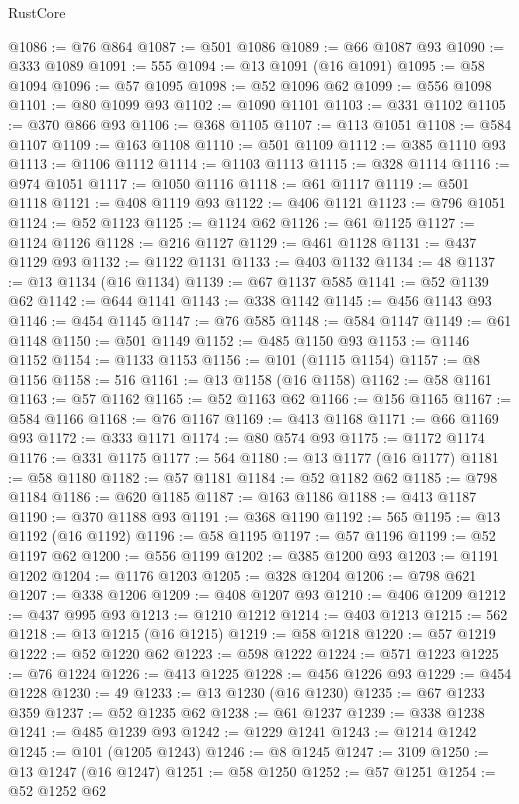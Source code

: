 \begin{lexlean}{RustCore}
\begin{coremodule}
@1086 := @76 @864
@1087 := @501 @1086
@1089 := @66 @1087 @93
@1090 := @333 @1089
@1091 := 555
@1094 := @13 @1091 (@16 @1091)
@1095 := @58 @1094
@1096 := @57 @1095
@1098 := @52 @1096 @62
@1099 := @556 @1098
@1101 := @80 @1099 @93
@1102 := @1090 @1101
@1103 := @331 @1102
@1105 := @370 @866 @93
@1106 := @368 @1105
@1107 := @113 @1051
@1108 := @584 @1107
@1109 := @163 @1108
@1110 := @501 @1109
@1112 := @385 @1110 @93
@1113 := @1106 @1112
@1114 := @1103 @1113
@1115 := @328 @1114
@1116 := @974 @1051
@1117 := @1050 @1116
@1118 := @61 @1117
@1119 := @501 @1118
@1121 := @408 @1119 @93
@1122 := @406 @1121
@1123 := @796 @1051
@1124 := @52 @1123
@1125 := @1124 @62
@1126 := @61 @1125
@1127 := @1124 @1126
@1128 := @216 @1127
@1129 := @461 @1128
@1131 := @437 @1129 @93
@1132 := @1122 @1131
@1133 := @403 @1132
@1134 := 48
@1137 := @13 @1134 (@16 @1134)
@1139 := @67 @1137 @585
@1141 := @52 @1139 @62
@1142 := @644 @1141
@1143 := @338 @1142
@1145 := @456 @1143 @93
@1146 := @454 @1145
@1147 := @76 @585
@1148 := @584 @1147
@1149 := @61 @1148
@1150 := @501 @1149
@1152 := @485 @1150 @93
@1153 := @1146 @1152
@1154 := @1133 @1153
@1156 := @101 (@1115 @1154)
@1157 := @8 @1156
@1158 := 516
@1161 := @13 @1158 (@16 @1158)
@1162 := @58 @1161
@1163 := @57 @1162
@1165 := @52 @1163 @62
@1166 := @156 @1165
@1167 := @584 @1166
@1168 := @76 @1167
@1169 := @413 @1168
@1171 := @66 @1169 @93
@1172 := @333 @1171
@1174 := @80 @574 @93
@1175 := @1172 @1174
@1176 := @331 @1175
@1177 := 564
@1180 := @13 @1177 (@16 @1177)
@1181 := @58 @1180
@1182 := @57 @1181
@1184 := @52 @1182 @62
@1185 := @798 @1184
@1186 := @620 @1185
@1187 := @163 @1186
@1188 := @413 @1187
@1190 := @370 @1188 @93
@1191 := @368 @1190
@1192 := 565
@1195 := @13 @1192 (@16 @1192)
@1196 := @58 @1195
@1197 := @57 @1196
@1199 := @52 @1197 @62
@1200 := @556 @1199
@1202 := @385 @1200 @93
@1203 := @1191 @1202
@1204 := @1176 @1203
@1205 := @328 @1204
@1206 := @798 @621
@1207 := @338 @1206
@1209 := @408 @1207 @93
@1210 := @406 @1209
@1212 := @437 @995 @93
@1213 := @1210 @1212
@1214 := @403 @1213
@1215 := 562
@1218 := @13 @1215 (@16 @1215)
@1219 := @58 @1218
@1220 := @57 @1219
@1222 := @52 @1220 @62
@1223 := @598 @1222
@1224 := @571 @1223
@1225 := @76 @1224
@1226 := @413 @1225
@1228 := @456 @1226 @93
@1229 := @454 @1228
@1230 := 49
@1233 := @13 @1230 (@16 @1230)
@1235 := @67 @1233 @359
@1237 := @52 @1235 @62
@1238 := @61 @1237
@1239 := @338 @1238
@1241 := @485 @1239 @93
@1242 := @1229 @1241
@1243 := @1214 @1242
@1245 := @101 (@1205 @1243)
@1246 := @8 @1245
@1247 := 3109
@1250 := @13 @1247 (@16 @1247)
@1251 := @58 @1250
@1252 := @57 @1251
@1254 := @52 @1252 @62

\end{coremodule}
\end{lexlean}
